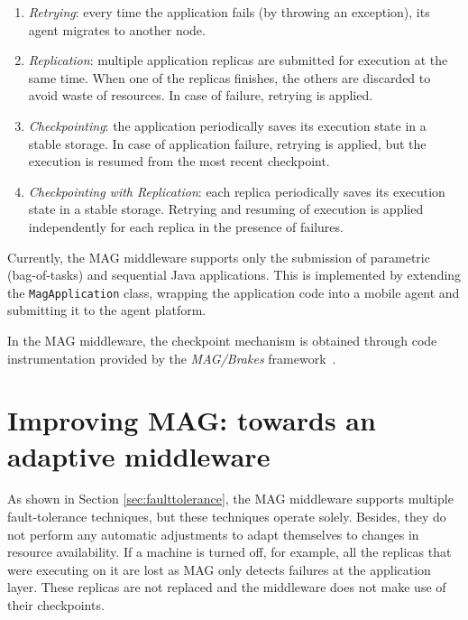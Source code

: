 \documentclass[times, 09pt, twocolumn]{article}
\begin{document}
\begin{enumerate}
    \item \emph{Retrying}: every time the application fails (by throwing an exception), its agent migrates to another node.

    \item \emph{Replication}: multiple application replicas are submitted
for execution at the same time. When one of the replicas finishes, the others
are discarded to avoid waste of resources. In case of failure,
retrying is applied.
   
    \item \emph{Checkpointing}: the application periodically saves its execution
state in a stable storage. In case of application failure, retrying is
applied, but the execution is resumed from the most recent checkpoint.
 
    \item \emph{Checkpointing with Replication}: each replica periodically saves
its execution state in a stable storage. Retrying and resuming of execution is
applied independently for each replica in the presence of failures.

\end{enumerate}

Currently, the MAG middleware supports only the submission of parametric (bag-of-tasks) and
sequential Java applications. This is implemented by extending
the {\tt MagApplication} class, wrapping the application code into a mobile agent and submitting
it to the agent platform. 

In the MAG middleware, the checkpoint mechanism is obtained through code
instrumentation provided by the \emph{MAG/Brakes} framework~\cite{brakes00}.

\section{Improving MAG: towards an adaptive middleware}\label{sec:adapt}

As shown in Section \ref{sec:faulttolerance}, the MAG middleware supports
multiple fault-tolerance techniques, but these techniques operate solely.
Besides, they do not perform any automatic adjustments to adapt themselves
to changes in resource availability. If a machine is turned off, for
example, all the replicas that were executing on it are lost as MAG only
detects failures at the application layer. These replicas are not replaced and
the middleware does not make use of their checkpoints.
\end{document}
